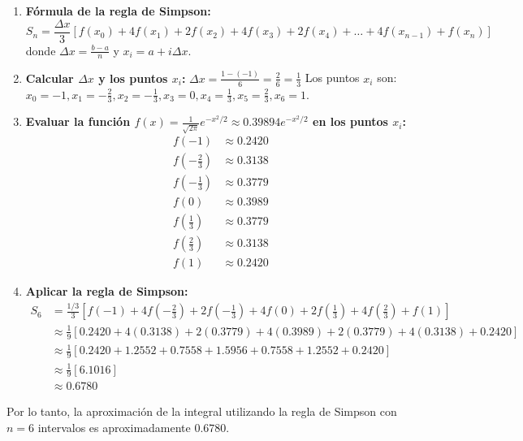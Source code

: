 \documentclass{article}
\begin{document}
\begin{enumerate}
    \item \textbf{Fórmula de la regla de Simpson:}
    $$S_n = \frac{\Delta x}{3} \left[ f(x_0) + 4f(x_1) + 2f(x_2) + 4f(x_3) + 2f(x_4) + \dots + 4f(x_{n-1}) + f(x_n) \right]$$
    donde $\Delta x = \frac{b - a}{n}$ y $x_i = a + i\Delta x$.

    \item \textbf{Calcular $\Delta x$ y los puntos $x_i$:}
    $\Delta x = \frac{1 - (-1)}{6} = \frac{2}{6} = \frac{1}{3}$
    Los puntos $x_i$ son: $x_0 = -1, x_1 = -\frac{2}{3}, x_2 = -\frac{1}{3}, x_3 = 0, x_4 = \frac{1}{3}, x_5 = \frac{2}{3}, x_6 = 1$.

    \item \textbf{Evaluar la función $f(x) = \frac{1}{\sqrt{2\pi}} e^{-x^2/2} \approx 0.39894 e^{-x^2/2}$ en los puntos $x_i$:}
    \begin{align*}
        f(-1) &\approx 0.2420 \\
        f(-\frac{2}{3}) &\approx 0.3138 \\
        f(-\frac{1}{3}) &\approx 0.3779 \\
        f(0) &\approx 0.3989 \\
        f(\frac{1}{3}) &\approx 0.3779 \\
        f(\frac{2}{3}) &\approx 0.3138 \\
        f(1) &\approx 0.2420
    \end{align*}

    \item \textbf{Aplicar la regla de Simpson:}
    \begin{align*}
        S_6 &= \frac{1/3}{3} \left[ f(-1) + 4f(-\frac{2}{3}) + 2f(-\frac{1}{3}) + 4f(0) + 2f(\frac{1}{3}) + 4f(\frac{2}{3}) + f(1) \right] \\
        &\approx \frac{1}{9} \left[ 0.2420 + 4(0.3138) + 2(0.3779) + 4(0.3989) + 2(0.3779) + 4(0.3138) + 0.2420 \right] \\
        &\approx \frac{1}{9} \left[ 0.2420 + 1.2552 + 0.7558 + 1.5956 + 0.7558 + 1.2552 + 0.2420 \right] \\
        &\approx \frac{1}{9} [6.1016] \\
        &\approx 0.6780
    \end{align*}
\end{enumerate}

Por lo tanto, la aproximación de la integral utilizando la regla de Simpson con $n = 6$ intervalos es aproximadamente $0.6780$.
\end{document}
